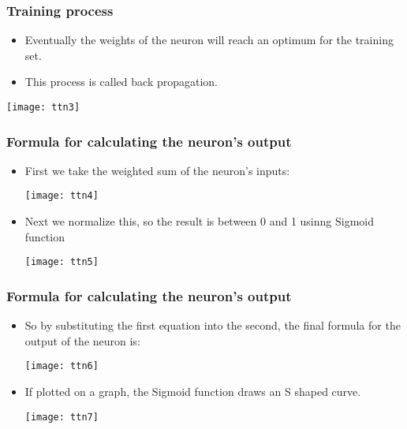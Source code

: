 \begin{frame}[fragile] \frametitle{Training process}
\begin{itemize}
\item Eventually the weights of the neuron will reach an optimum for the training set.
\item This process is called back propagation.
\end{itemize}
\begin{center}
\texttt{[image: ttn3]}
\end{center}
\end{frame}


\begin{frame}[fragile] \frametitle{Formula for calculating the neuron's output}
\begin{itemize}
\item First we take the weighted sum of the neuron's inputs:
\begin{center}
\texttt{[image: ttn4]}
\end{center}
\item Next we normalize this, so the result is between 0 and 1 usinng Sigmoid function
\begin{center}
\texttt{[image: ttn5]}
\end{center}
\end{itemize}
\end{frame}


\begin{frame}[fragile] \frametitle{Formula for calculating the neuron's output}
\begin{itemize}
\item So by substituting the first equation into the second, the final formula for the output of the neuron is:
\begin{center}
\texttt{[image: ttn6]}
\end{center}
\item If plotted on a graph, the Sigmoid function draws an S shaped curve.
\begin{center}
\texttt{[image: ttn7]}
\end{center}
\end{itemize}
\end{frame}

